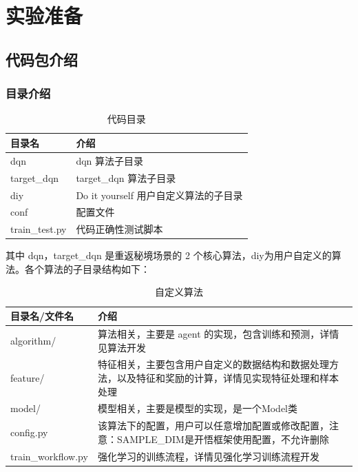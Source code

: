 \section{实验准备}

\subsection{代码包介绍}

\subsubsection{目录介绍}


\begin{table}[H]
    \begin{tabularx}{1\textwidth}{ l X } %
        \hline %
        \textbf{目录名} & \textbf{介绍}  \\
        \hline
        dqn&dqn 算法子目录\\
        target\_dqn&target\_dqn 算法子目录\\
        diy&Do it yourself 用户自定义算法的子目录\\
        conf&配置文件\\
        train\_test.py&代码正确性测试脚本\\
        \hline
    \end{tabularx}

    \centering
    \caption{代码目录}
    \label{directory}
\end{table}

其中 dqn，target\_dqn 是重返秘境场景的 2 个核心算法，diy为用户自定义的算法。各个算法的子目录结构如下：

\begin{table}[H]
    \begin{tabularx}{1\textwidth}{ l X } %
        \hline %
        \textbf{目录名/文件名} & \textbf{介绍}  \\
        \hline
        algorithm/&算法相关，主要是 agent 的实现，包含训练和预测，详情见算法开发\\
        feature/&特征相关，主要包含用户自定义的数据结构和数据处理方法，以及特征和奖励的计算，详情见实现特征处理和样本处理\\
        model/&模型相关，主要是模型的实现，是一个Model类\\
        config.py&该算法下的配置，用户可以任意增加配置或修改配置，注意：SAMPLE\_DIM是开悟框架使用配置，不允许删除\\
        train\_workflow.py&强化学习的训练流程，详情见强化学习训练流程开发        \\
        \hline
    \end{tabularx}

    \centering
    \caption{自定义算法}
    \label{directory:alg}
\end{table}


